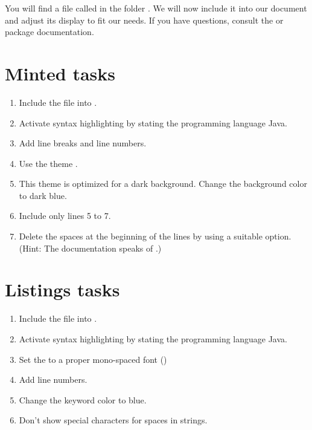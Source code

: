 You will find a file called  in the folder 
.
We will now include it into our document and adjust its display to fit our needs.
If you have questions, consult the  or  package documentation.

\section*{Minted tasks}

\begin{enumerate}
  \item Include the file into 
  .
  \item Activate syntax highlighting by stating the programming language Java.
  \item Add line breaks and line numbers.
  \item Use the theme .
  \item This theme is optimized for a dark background. Change the background color to dark blue.
  \item Include only lines 5 to 7.
  \item Delete the spaces at the beginning of the lines by using a suitable 
  option. (Hint: The documentation speaks of .)
\end{enumerate}

\section*{Listings tasks}

\begin{enumerate}
  \item Include the file into 
  .
  \item Activate syntax highlighting by stating the programming language Java.
  \item Set the  to a proper mono-spaced font ()
  \item Add line numbers.
  \item Change the keyword color to blue.
  \item Don't show special characters for spaces in strings.
\end{enumerate}


